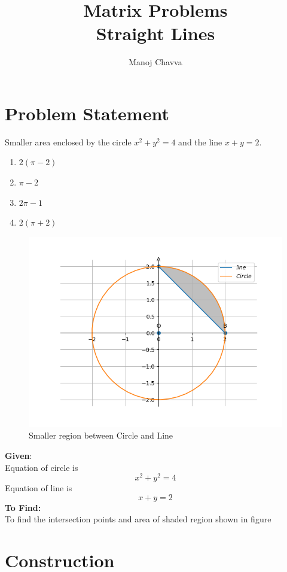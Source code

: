 \documentclass[journal,12pt,twocolumn]{IEEEtran}
\title{Matrix Problems \textbf{\\Straight Lines }}
\author{Manoj Chavva}
\begin{document}
\maketitle
\section{Problem Statement}

\noindent Smaller area enclosed by the circle $x^2 + y^2 = 4$ and the line $x + y = 2$. 
\begin{enumerate}
\item $2(\pi -2)$
\item $\pi -2$
\item $2\pi -1$
\item $2(\pi +2)$
\end{enumerate}


\begin{figure}[h]
\includegraphics[width=1\columnwidth]{./figs/conic.png}
\caption{Smaller region between Circle and Line}
\label{fig:conic}
\end{figure}

\raggedright \textbf{Given}: \\
Equation of circle is  
\begin{equation} x^2 + y^2 = 4
\end{equation}
Equation of line is 
\begin{equation}
x+y=2
\end{equation}
\textbf{To Find:} \\
To find the intersection points and area of shaded region shown in figure\
\section{Construction}
\end{document}
